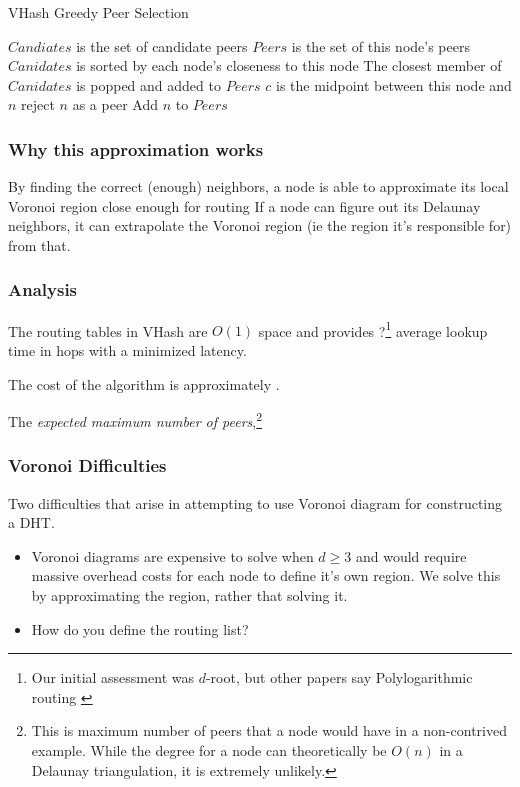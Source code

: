 \documentclass{IEEEtran}
\begin{document}
\begin{algorithm}
\caption{VHash Greedy Peer Selection}
\label{peer}
\begin{algorithmic}[1]  %
	\STATE $Candiates$ is the set of candidate peers
    \STATE $Peers$ is the set of this node's peers
    \STATE $Canidates$ is sorted by each node's closeness to this node
    \STATE The closest member of $Canidates$ is popped and added to $Peers$
    	\STATE $c$ is the midpoint between this node and $n$
        	\STATE reject $n$ as a peer
        \ELSE
        	\STATE Add $n$ to $Peers$
        \ENDIF
    \ENDFOR
\end{algorithmic}
\end{algorithm}


\subsubsection{Why this approximation works}
By finding the correct (enough) neighbors, a node is able to approximate its local Voronoi region close enough for routing
If a node can figure out its Delaunay neighbors, it can extrapolate the Voronoi region (ie the region it's responsible for) from that. 


\subsubsection{Analysis}
The routing tables in VHash are $O(1)$ space and provides ?\footnote{Our initial assessment was $d$-root, but other papers say Polylogarithmic routing \cite{kleinberg2000navigation} \cite{raynet}} average lookup time in hops with a minimized latency.


The cost of the algorithm is approximately .

The \textit{expected maximum number of peers},\footnote{This is maximum number of peers that a node would have in a non-contrived example.  While the degree for a node can theoretically be $O(n)$ in a Delaunay triangulation, it is extremely unlikely.}



\subsubsection{Voronoi Difficulties}
Two difficulties that arise in attempting to use Voronoi diagram for constructing a DHT.
\begin{itemize}
	\item Voronoi diagrams are expensive to solve when $d \geq 3$ and would require massive overhead costs for each node to define it's own region.  We solve this by approximating the region, rather that solving it.
	\item How do you define the routing list?
\end{itemize}
\end{document}
